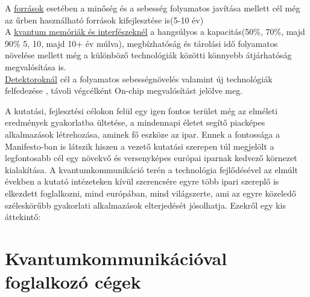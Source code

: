 A \underline{források} esetében a minőség és a sebesség folyamatos javítása mellett cél még az űrben használható források kifejlesztése is(5-10 év)\\
A \underline{kvantum memóriák és interfészeknél} a hangsúlyos a kapacitás(50\%, 70\%, majd 90\% 5, 10, majd 10+ év múlva), megbízhatóság és tárolási idő folyamatos növelése mellett még a különböző technológiák közötti könnyebb átjárhatóság megvalósítása is. \\
\underline{Detektoroknál} cél a folyamatos sebességnövelés valamint új technológiák felfedezése , távoli végcélként On-chip megvalósítást jelölve meg.

A kutatási, fejlesztési célokon felül egy igen fontos terület még az elméleti eredmények gyakorlatba ültetése, a mindennapi életet segítő piacképes alkalmazások létrehozása, aminek fő eszköze az ipar. Ennek a fontossága a Manifesto-ban is látszik hiszen a vezető kutatási szerepen túl megjelölt a legfontosabb cél egy növekvő és versenyképes európai iparnak kedvező körnezet kialakítása. A kvantumkommunikáció terén a technológia fejlődésével az elmúlt években a kutató intézeteken kívül szerencsére egyre több ipari szereplő is elkezdett foglalkozni, mind európában, mind világszerte, ami az egyre közeledő széleskörűbb gyakorlati alkalmazások elterjedését jósolhatja. Ezekről egy kis áttekintő: \\

\section*{Kvantumkommunikációval foglalkozó cégek}

